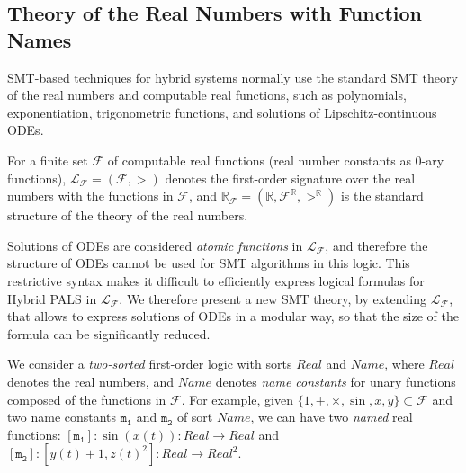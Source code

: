 %


\subsection{Theory of the Real Numbers with Function Names}

SMT-based techniques for hybrid systems
normally use the standard SMT theory of the real numbers and computable %
real functions,
such as polynomials, exponentiation, trigonometric functions,  
and solutions of Lipschitz-continuous ODEs.

\begin{definition}
For a finite set $\mathcal{F}$ of computable real functions
(real number constants as $0$-ary functions),
%
$\mathcal{L}_\mathcal{F} = (\mathcal{F}, >)$ denotes the first-order signature over the real numbers
with the functions in $\mathcal{F}$,
and $\mathbb{R}_\mathcal{F} = (\mathbb{R}, \mathcal{F}^\mathbb{R}, >^\mathbb{R})$
is the standard structure of the theory of the real numbers.
\end{definition}


Solutions of ODEs are considered  \emph{atomic functions} in $\mathcal{L}_\mathcal{F}$,
and therefore the structure of ODEs cannot be used for SMT algorithms  in this logic.
This restrictive syntax makes it difficult to efficiently express logical formulas for Hybrid PALS 
in $\mathcal{L}_\mathcal{F}$. 
We therefore present a new SMT theory,
by extending $\mathcal{L}_\mathcal{F}$, that allows to express solutions of ODEs in a modular way,
so that the size of the formula can be significantly reduced.


We consider a \emph{two-sorted} first-order logic with sorts $\mathit{Real}$ and $\mathit{Name}$,
where $\mathit{Real}$ denotes the real numbers,
and $\mathit{Name}$ denotes \emph{name constants} 
for unary functions composed of the functions in $\mathcal{F}$.
For example, given $\{1, +, \times, \sin, x, y\} \subset \mathcal{F}$
and two name constants $\mathtt{m_1}$ and $\mathtt{m_2}$ of sort $\mathit{Name}$,
we can have two \emph{named} %
real functions:
$[\mathtt{m_1}]: %
\sin(x(t)) :\mathit{Real} \to \mathit{Real}$
and
$[\mathtt{m_2}]: %
[y(t) + 1, z(t)^2] :  \mathit{Real} \to \mathit{Real}^2$.


